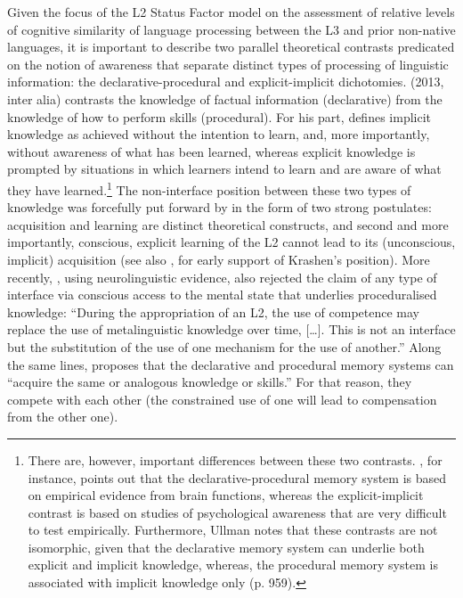 \documentclass[output=paper,modfonts,nonflat,newtxmath]{langsci/langscibook}
\begin{document}
Given the focus of the L2 Status Factor model on the assessment of relative levels of cognitive similarity of language processing between the L3 and prior non-native languages, it is important to describe two parallel theoretical contrasts predicated on the notion of awareness that separate distinct types of processing of linguistic information: the declarative-procedural and explicit-implicit dichotomies. \citeauthor{Anderson2013} (2013, inter alia) contrasts the knowledge of factual information (declarative) from the knowledge of how to perform skills (procedural). For his part, \citet[269]{Williams2005} defines implicit knowledge as achieved without the intention to learn, and, more importantly, without awareness of what has been learned, whereas explicit knowledge is prompted by situations in which learners intend to learn and are aware of what they have learned.\footnote{There are, however, important differences between these two contrasts. \citet{Ullman2016}, for instance, points out that the declarative-procedural memory system is based on empirical evidence from brain functions, whereas the explicit-implicit contrast is based on studies of psychological awareness that are very difficult to test empirically. Furthermore, Ullman notes that these contrasts are not isomorphic, given that the declarative memory system can underlie both explicit and implicit knowledge, whereas, the procedural memory system is associated with implicit knowledge only (p. 959).} The non-interface position between these two types of knowledge was forcefully put forward by \citet{Krashen1985} in the form of two strong postulates: acquisition and learning are distinct theoretical constructs, and second and more importantly, conscious, explicit learning of the L2 cannot lead to its (unconscious, implicit) acquisition (see also \citealt{Schwartz1993, AthanasopoulosEtAl2015}, for early support of Krashen’s position). More recently, \citet[63]{Paradis2009}, using neurolinguistic evidence, also rejected the claim of any type of interface via conscious access to the mental state that underlies proceduralised knowledge: “During the appropriation of an L2, the use of competence may replace the use of metalinguistic knowledge over time, […]. This is not an interface but the substitution of the use of one mechanism for the use of another.” Along the same lines, \citet[956--957]{Ullman2016} proposes that the declarative and procedural memory systems can “acquire the same or analogous knowledge or skills.” For that reason, they compete with each other (the constrained use of one will lead to compensation from the other one).
\end{document}
